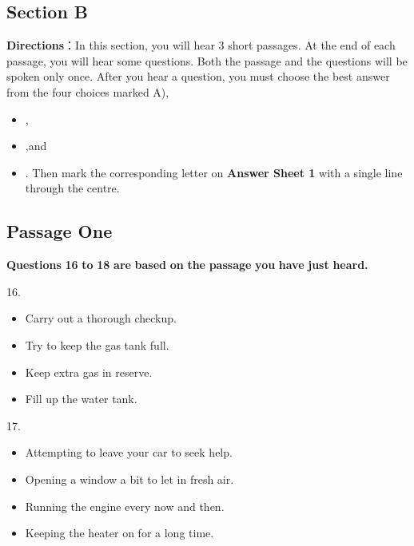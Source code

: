 \documentclass[UTF8,11pt]{ctexart}
\begin{document}
\subsection*{Section B}


\textbf{Directions}：In this section, you will hear 3 short passages. At the end of each passage, you will hear some questions. Both the passage and the questions will be spoken only once. After you hear a question, you must choose the best answer from the four choices marked A),


\begin{itemize}[leftmargin=2em,itemsep=.2em,topsep=.4em]\item[B.] ,
\item[C.] ,and
\item[D.] . Then mark the corresponding letter on \textbf{Answer Sheet 1} with a single line through the centre.
\end{itemize}

\subsection*{\textbf{Passage} \textbf{One}}


\textbf{Questions} \textbf{16} \textbf{to} \textbf{18} \textbf{are} \textbf{based} \textbf{on} \textbf{the} \textbf{passage} \textbf{you} \textbf{have} \textbf{just} \textbf{heard.}


16.


\begin{itemize}[leftmargin=2em,itemsep=.2em,topsep=.4em]\item[A.] Carry out a thorough checkup.
\item[B.] Try to keep the gas tank full.
\item[C.] Keep extra gas in reserve.
\item[D.] Fill up the water tank.
\end{itemize}

17.


\begin{itemize}[leftmargin=2em,itemsep=.2em,topsep=.4em]\item[A.] Attempting to leave your car to seek help.
\item[B.] Opening a window a bit to let in fresh air.
\item[C.] Running the engine every now and then.
\item[D.] Keeping the heater on for a long time.
\end{itemize}
\end{document}
